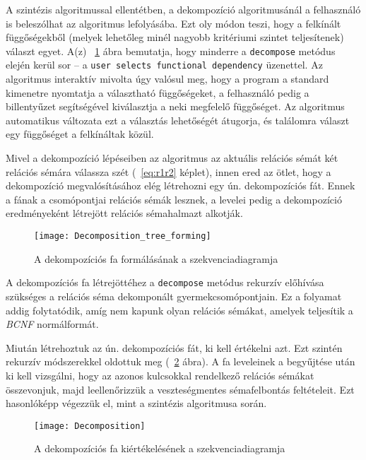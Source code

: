 A szintézis algoritmussal ellentétben, a dekompozíció algoritmusánál a felhasználó is beleszólhat az algoritmus lefolyásába. Ezt oly módon teszi, hogy a felkínált függőségekből (melyek lehetőleg minél nagyobb kritériumi szintet teljesítenek) választ egyet. A(z) ~\ref{fig:dectree} ábra bemutatja, hogy minderre a \lstinline{decompose} metódus elején kerül sor – a \lstinline{user selects functional dependency} üzenettel. Az algoritmus interaktív mivolta úgy valósul meg, hogy a program a standard kimenetre nyomtatja a választható függőségeket, a felhasználó pedig a billentyűzet segítségével kiválasztja a neki megfelelő függőséget. Az algoritmus automatikus változata ezt a választás lehetőségét átugorja, és találomra választ egy függőséget a felkínáltak közül.

Mivel a dekompozíció lépéseiben az algoritmus az aktuális relációs sémát két relációs sémára válassza szét (~\ref{eq:r1r2} képlet), innen ered az ötlet, hogy a dekompozíció megvalósításához elég létrehozni egy ún. dekompozíciós fát. Ennek a fának a csomópontjai relációs sémák lesznek, a levelei pedig a dekompozíció eredményeként létrejött relációs sémahalmazt alkotják.

\begin{figure}
    \centering
    \texttt{[image: Decomposition\_tree\_forming]}
    \caption{A dekompozíciós fa formálásának a szekvenciadiagramja}
    \label{fig:dectree}
\end{figure}

A dekompozíciós fa létrejöttéhez a \lstinline{decompose} metódus rekurzív előhívása szükséges a relációs séma dekomponált gyermekcsomópontjain. Ez a folyamat addig folytatódik, amíg nem kapunk olyan relációs sémákat, amelyek teljesítik a \textit{BCNF} normálformát.

Miután létrehoztuk az ún. dekompozíciós fát, ki kell értékelni azt. Ezt szintén rekurzív módszerekkel oldottuk meg (~\ref{fig:decomposition} ábra). A fa leveleinek a begyűjtése után ki kell vizsgálni, hogy az azonos kulcsokkal rendelkező relációs sémákat összevonjuk, majd leellenőrizzük a veszteségmentes sémafelbontás feltételeit. Ezt hasonlóképp végezzük el, mint a szintézis algoritmusa során. 

\begin{figure}
    \centering
    \texttt{[image: Decomposition]}
    \caption{A dekompozíciós fa kiértékelésének a szekvenciadiagramja}
    \label{fig:decomposition}
\end{figure}

